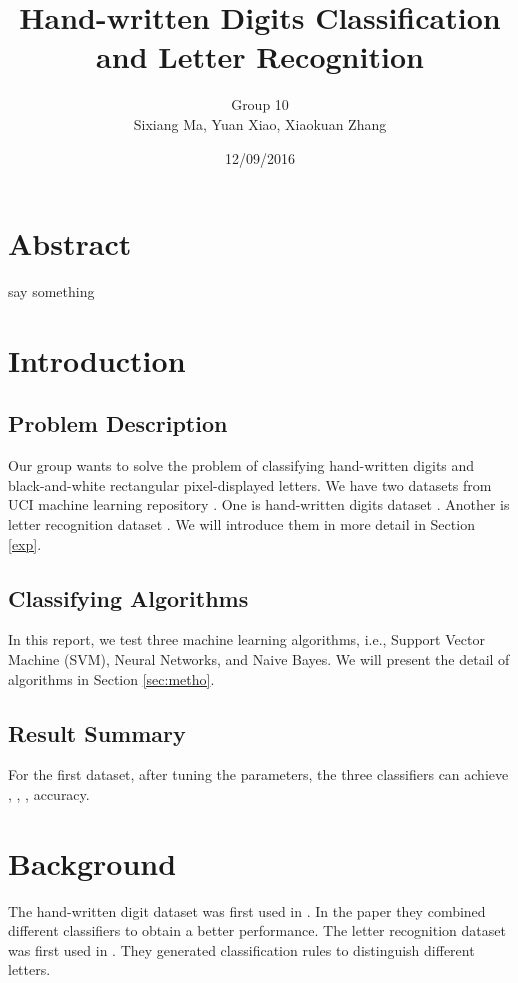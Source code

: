 \documentclass[11pt]{article}
\title{Hand-written Digits Classification and Letter Recognition}
\author{Group 10 \\ Sixiang Ma, Yuan Xiao, Xiaokuan Zhang}
\date{12/09/2016}
\begin{document}
\maketitle
\section*{Abstract}
say something

\section{Introduction}

\subsection{Problem Description}
Our group wants to solve the problem of classifying hand-written digits and  black-and-white rectangular pixel-displayed letters. We have two datasets from UCI machine learning repository \cite{Lichman2013}. One is hand-written digits dataset \cite{digitdataset}. Another is letter recognition dataset \cite{letterdataset}. We will introduce them in more detail in Section \ref{exp}.

\subsection{Classifying Algorithms}
In this report, we test three machine learning  algorithms, i.e., Support Vector Machine (SVM), Neural Networks, and Naive Bayes. We will present the detail of algorithms in Section \ref{sec:metho}.
\subsection{Result Summary}
For the first dataset, after tuning the parameters, the three classifiers can achieve , , , accuracy. 

\section{Background}
The hand-written digit dataset was first used in \cite{kaynak1995methods}. In the paper they combined different classifiers to obtain a better performance.  The letter recognition dataset was first used in \cite{frey1991letter}. They generated classification rules to distinguish different letters.
\end{document}
